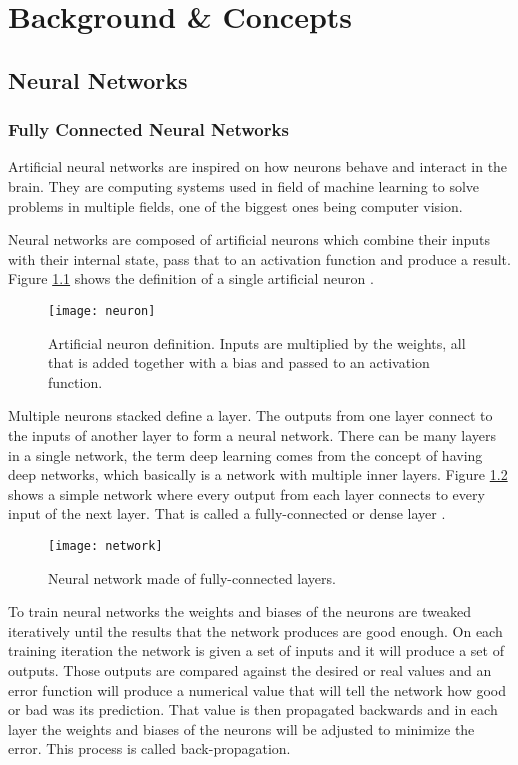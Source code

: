 \chapter{Background \& Concepts}
\label{ch:background}

\section{Neural Networks}

\subsection{Fully Connected Neural Networks}

Artificial neural networks are inspired on how neurons behave and interact in the brain. They are computing systems used in field of machine learning to solve problems in multiple fields, one of the biggest ones being computer vision.

Neural networks are composed of artificial neurons which combine their inputs with their internal state, pass that to an activation function and produce a result. Figure \ref{fig:neuron} shows the definition of a single artificial neuron \cite{nn_def}.

\begin{figure}[thbp]
	\centering
	\texttt{[image: neuron]}
	\caption{Artificial neuron definition. Inputs are multiplied by the weights, all that is added together with a bias and passed to an activation function.}
	\label{fig:neuron}
\end{figure}

Multiple neurons stacked define a layer. The outputs from one layer connect to the inputs of another layer to form a neural network. There can be many layers in a single network, the term deep learning comes from the concept of having deep networks, which basically is a network with multiple inner layers. Figure \ref{fig:network} shows a simple network where every output from each layer connects to every input of the next layer. That is called a fully-connected or dense layer \cite{intro_cnn}.

\begin{figure}[thbp]
	\centering
	\texttt{[image: network]}
	\caption{Neural network made of fully-connected layers.}
	\label{fig:network}
\end{figure}

To train neural networks the weights and biases of the neurons are tweaked iteratively until the results that the network produces are good enough. On each training iteration the network is given a set of inputs and it will produce a set of outputs. Those outputs are compared against the desired or real values and an error function will produce a numerical value that will tell the network how good or bad was its prediction. That value is then propagated backwards and in each layer the weights and biases of the neurons will be adjusted to minimize the error. This process is called back-propagation.

